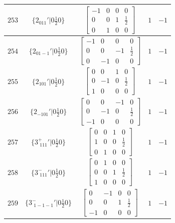 \documentclass[fleqn,8pt]{jsarticle}
\begin{document}
\begin{longtable}{ccccc}
$ 253 $ & $ \{2{}_{011}{}'|0 \frac{1}{2} 0\} $ & $ \begin{bmatrix} -1 & 0 & 0 & 0 \\ 0 & 0 & 1 & \frac{1}{2} \\ 0 & 1 & 0 & 0 \end{bmatrix} $ & $ 1 $ & $ -1 $ \\ \hline
$ 254 $ & $ \{2{}_{01-1}{}'|0 \frac{1}{2} 0\} $ & $ \begin{bmatrix} -1 & 0 & 0 & 0 \\ 0 & 0 & -1 & \frac{1}{2} \\ 0 & -1 & 0 & 0 \end{bmatrix} $ & $ 1 $ & $ -1 $ \\ \hline
$ 255 $ & $ \{2{}_{101}{}'|0 \frac{1}{2} 0\} $ & $ \begin{bmatrix} 0 & 0 & 1 & 0 \\ 0 & -1 & 0 & \frac{1}{2} \\ 1 & 0 & 0 & 0 \end{bmatrix} $ & $ 1 $ & $ -1 $ \\ \hline
$ 256 $ & $ \{2{}_{-101}{}'|0 \frac{1}{2} 0\} $ & $ \begin{bmatrix} 0 & 0 & -1 & 0 \\ 0 & -1 & 0 & \frac{1}{2} \\ -1 & 0 & 0 & 0 \end{bmatrix} $ & $ 1 $ & $ -1 $ \\ \hline
$ 257 $ & $ \{3^{+}_{\,\,111}{}'|0 \frac{1}{2} 0\} $ & $ \begin{bmatrix} 0 & 0 & 1 & 0 \\ 1 & 0 & 0 & \frac{1}{2} \\ 0 & 1 & 0 & 0 \end{bmatrix} $ & $ 1 $ & $ -1 $ \\ \hline
$ 258 $ & $ \{3^{-}_{\,\,111}{}'|0 \frac{1}{2} 0\} $ & $ \begin{bmatrix} 0 & 1 & 0 & 0 \\ 0 & 0 & 1 & \frac{1}{2} \\ 1 & 0 & 0 & 0 \end{bmatrix} $ & $ 1 $ & $ -1 $ \\ \hline
$ 259 $ & $ \{3^{-}_{\,\,1-1-1}{}'|0 \frac{1}{2} 0\} $ & $ \begin{bmatrix} 0 & -1 & 0 & 0 \\ 0 & 0 & 1 & \frac{1}{2} \\ -1 & 0 & 0 & 0 \end{bmatrix} $ & $ 1 $ & $ -1 $ \\ \hline

\end{longtable}
\end{document}
